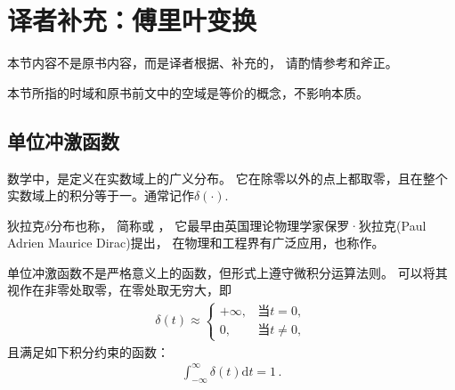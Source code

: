 \section{译者补充：傅里叶变换}\label{sec:译者补充：傅里叶变换}
\begin{remark}
    本节内容不是原书内容，而是译者根据\citet{enwiki:1115652231,enwiki:1115414995,
        enwiki:1098200554,enwiki:1114206769}、\citet{DigitalSignalProcessing}补充的，
    请酌情参考和斧正。
\end{remark}
\begin{notation}
    本节所指的时域和原书前文中的空域是等价的概念，不影响本质。
\end{notation}
\subsection{单位冲激函数}\label{sub:单位冲激函数}
\begin{definition}
    数学中，是定义在实数域上的广义分布。
    它在除零以外的点上都取零，且在整个实数域上的积分等于一。通常记作$\delta(\cdot)$.
\end{definition}

狄拉克$\delta$分布也称，
简称或
，
它最早由英国理论物理学家保罗·狄拉克(Paul Adrien Maurice Dirac)提出，
在物理和工程界有广泛应用，也称作。

单位冲激函数不是严格意义上的函数，但形式上遵守微积分运算法则。
可以将其视作在非零处取零，在零处取无穷大，即
\begin{align}
    \delta(t)\approx\left\{
    \begin{array}{ll}
        +\infty, & \text{当}t=0,     \\
        0,       & \text{当}t\neq 0,
    \end{array}
    \right.
\end{align}
且满足如下积分约束的函数：
\begin{align}
    \int_{-\infty}^{\infty}\delta(t)\mathrm{d}t=1\, .
\end{align}

